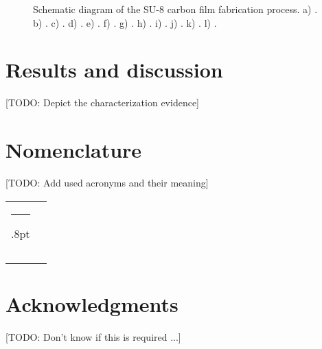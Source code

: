 \documentclass[3p,,preprint,12pt]{elsarticle}
\makeatletter
\def\hlinewd#1{%
  \noalign{\ifnum0=`}\fi\hrule \@height #1%
  \futurelet\reserved@a\@xhline}
\def\tbltoprule{\hlinewd{.8pt}\\[-12pt]}
\def\tblbottomrule{\noalign{\vspace*{6pt}}\hline\noalign{\vspace*{2pt}}}
\def\fixFloatSize#1{}%
\makeatother
\begin{document}
\bgroup
\fixFloatSize{images/8b20b7c4-6432-49d6-aeab-5f61950533fe-umethod.png}
\begin{figure*}[!htbp]
\centering \makeatletter{}
\makeatother 
\caption{{Schematic diagram of the SU-8 carbon film fabrication process. a) . b) . c) . d) . e) . f) . g) . h) . i) . j) . k) . l) . }}
\label{f-471d296f0590}
\end{figure*}
\egroup

    
\section{Results and discussion}
[TODO: Depict the characterization evidence]
    
\section{Nomenclature}
[TODO: Add used acronyms and their meaning]
\begin{table}[!htbp]
\def\arraystretch{1}
\ignorespaces 
\centering 
\begin{tabulary}{\linewidth}{LL}
\tbltoprule 
 &
  \\
\tblbottomrule 
\end{tabulary}\par 
\end{table}

\section*{Acknowledgments} [TODO: Don't know if this is required ...]
    






\end{document}
